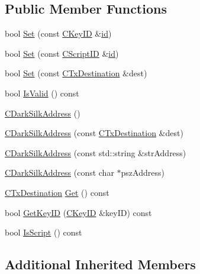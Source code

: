 \subsection*{Public Member Functions}
\begin{DoxyCompactItemize}
\item 
bool \hyperlink{class_c_dark_silk_address_adafb09872a993f450999c4e4ea0e795b}{Set} (const \hyperlink{class_c_key_i_d}{C\+Key\+I\+D} \&\hyperlink{db__test_8cc_a7441ef0865bcb3db9b8064dd7375c1ea}{id})
\item 
bool \hyperlink{class_c_dark_silk_address_a8c9a41628a14007896053a4369450fb3}{Set} (const \hyperlink{class_c_script_i_d}{C\+Script\+I\+D} \&\hyperlink{db__test_8cc_a7441ef0865bcb3db9b8064dd7375c1ea}{id})
\item 
bool \hyperlink{class_c_dark_silk_address_af9df1160053b931a3a64d2d96e24506e}{Set} (const \hyperlink{keystore_8h_a8f46ecba0ddeb036be6b58d6ed1909cd}{C\+Tx\+Destination} \&dest)
\item 
bool \hyperlink{class_c_dark_silk_address_ab98113189d0746ea660447efe3700103}{Is\+Valid} () const 
\item 
\hyperlink{class_c_dark_silk_address_a4bbd665731f12aa75a20630ac3698794}{C\+Dark\+Silk\+Address} ()
\item 
\hyperlink{class_c_dark_silk_address_ac1364842bceba92a0d811637d6dd360a}{C\+Dark\+Silk\+Address} (const \hyperlink{keystore_8h_a8f46ecba0ddeb036be6b58d6ed1909cd}{C\+Tx\+Destination} \&dest)
\item 
\hyperlink{class_c_dark_silk_address_a3d493985b3ca92d72d9ffe9251082f46}{C\+Dark\+Silk\+Address} (const std\+::string \&str\+Address)
\item 
\hyperlink{class_c_dark_silk_address_a42fe9fc2e904a2bed7b140d16a0d7b9b}{C\+Dark\+Silk\+Address} (const char $\ast$psz\+Address)
\item 
\hyperlink{keystore_8h_a8f46ecba0ddeb036be6b58d6ed1909cd}{C\+Tx\+Destination} \hyperlink{class_c_dark_silk_address_a907e63758c7914a246b5807f6babf97d}{Get} () const 
\item 
bool \hyperlink{class_c_dark_silk_address_ab305645f49be30fdeac6290debf029ec}{Get\+Key\+I\+D} (\hyperlink{class_c_key_i_d}{C\+Key\+I\+D} \&key\+I\+D) const 
\item 
bool \hyperlink{class_c_dark_silk_address_aae1f7d243d122e41b4cddf481c6b0543}{Is\+Script} () const 
\end{DoxyCompactItemize}
\subsection*{Additional Inherited Members}


